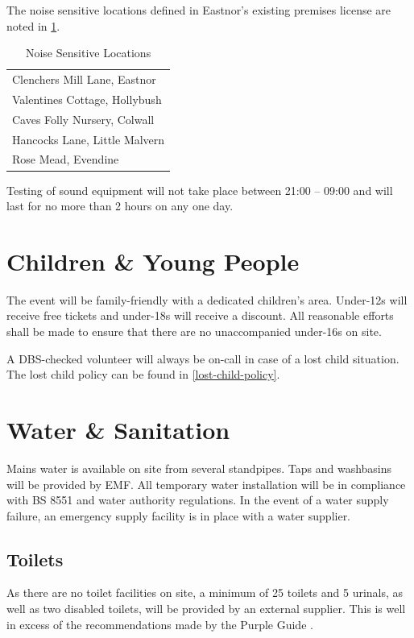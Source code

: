 The noise sensitive locations defined in Eastnor's existing premises license
are noted in \cref{table:noiselocations}.

\begin{table}[h!]
    \caption{Noise Sensitive Locations}
    \label{table:noiselocations}
    \centering
    \begin{tabular}{| l |}
        \hline
      Clenchers Mill Lane, Eastnor \\
      Valentines Cottage, Hollybush \\
      Caves Folly Nursery, Colwall \\
      Hancocks Lane, Little Malvern \\
      Rose Mead, Evendine \\
        \hline
    \end{tabular}
\end{table}

Testing of sound equipment will not take place between 21:00 -- 09:00 and
will last for no more than 2 hours on any one day.

\section{Children \& Young People}

The event will be family-friendly with a dedicated children's area. Under-12s will receive free
tickets and under-18s will receive a discount. All reasonable efforts shall be made to ensure
that there are no unaccompanied under-16s on site.

A DBS-checked volunteer will always be on-call in case of a lost child situation. The lost child
policy can be found in \cref{lost-child-policy}.

\section{Water \& Sanitation}\label{water}
Mains water is available on site from several standpipes. Taps and washbasins will be provided by EMF\@.
All temporary water installation will be in compliance with BS 8551 \cite{bs8551} and water authority regulations.
In the event of a water supply failure, an emergency supply facility is in place with a water supplier.

\subsection{Toilets}

As there are no toilet facilities on site, a minimum of 25 toilets and 5 urinals,
as well as two disabled toilets, will be provided by an external supplier. This
is well in excess of the recommendations made by the Purple Guide \cite{purpleguide}.

